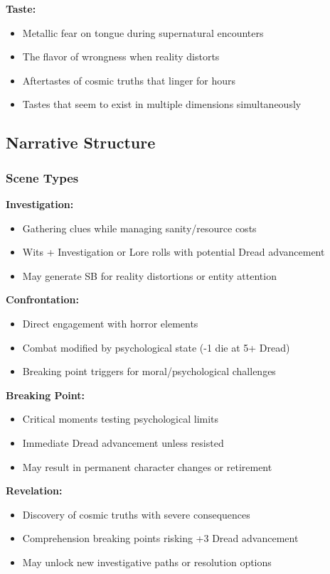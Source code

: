 \documentclass[11pt]{article}
\begin{document}
\textbf{Taste:}
\begin{itemize}
\item Metallic fear on tongue during supernatural encounters
\item The flavor of wrongness when reality distorts
\item Aftertastes of cosmic truths that linger for hours
\item Tastes that seem to exist in multiple dimensions simultaneously
\end{itemize}

\subsection{Narrative Structure}

\subsubsection{Scene Types}

\textbf{Investigation:}
\begin{itemize}
\item Gathering clues while managing sanity/resource costs
\item Wits + Investigation or Lore rolls with potential Dread advancement
\item May generate SB for reality distortions or entity attention
\end{itemize}

\textbf{Confrontation:}
\begin{itemize}
\item Direct engagement with horror elements
\item Combat modified by psychological state (-1 die at 5+ Dread)
\item Breaking point triggers for moral/psychological challenges
\end{itemize}

\textbf{Breaking Point:}
\begin{itemize}
\item Critical moments testing psychological limits
\item Immediate Dread advancement unless resisted
\item May result in permanent character changes or retirement
\end{itemize}

\textbf{Revelation:}
\begin{itemize}
\item Discovery of cosmic truths with severe consequences
\item Comprehension breaking points risking +3 Dread advancement
\item May unlock new investigative paths or resolution options
\end{itemize}
\end{document}
